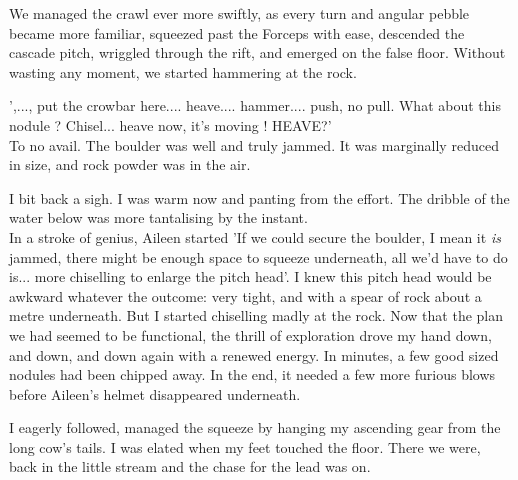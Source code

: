 We managed the crawl ever more swiftly, as every turn and angular pebble became more familiar, squeezed past the Forceps with ease, descended the cascade pitch, wriggled through the rift, and emerged on the false floor. Without wasting any moment, we started hammering at the rock. 

',..., put the crowbar here.... heave.... hammer.... push, no pull. What about this nodule ? Chisel... heave now, it's moving ! HEAVE?'\\ 
To no avail. The boulder was well and truly jammed. It was marginally reduced in size, and rock powder was in the air.

I bit back a sigh. I was warm now and panting from the effort. The dribble of the water below was more tantalising by the instant. \\
In a stroke of genius, Aileen started 'If we could secure the boulder, I mean it \emph{is} jammed, there might be enough space to squeeze underneath, all we'd have to do is... more chiselling to enlarge the pitch head'.
I knew this pitch head would be awkward whatever the outcome: very tight, and with a spear of rock about a metre underneath. But I started chiselling madly at the rock. Now that the plan we had seemed to be functional, the thrill of exploration drove my hand down, and down, and down again with a renewed energy. In minutes, a few good sized nodules had been chipped away. In the end, it needed a few more furious blows before Aileen's helmet disappeared underneath.

I eagerly followed, managed the squeeze by hanging my ascending gear from the long cow's tails. I was elated when my feet touched the floor. There we were, back in the little stream and the chase for the lead was on.


